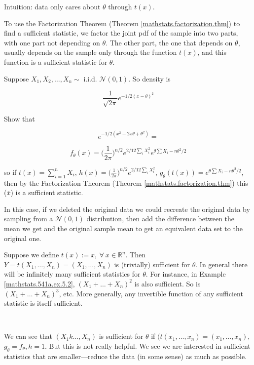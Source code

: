 \begin{remark} Intuition: data only cares about \(\theta\) through \(t(x)\). 

\end{remark}

To use the Factorization Theorem (Theorem \ref{mathstats.factorization.thm}) to find a sufficient statistic, we factor the joint pdf of the sample into two parts, with one part not depending on \(\theta\). The other part, the one that depends on \(\theta\), usually depends on the sample only through the function \(t(x)\), and this function is a sufficient statistic for \(\theta\).

\begin{exercise} Suppose \(X_1, X_2, \ldots, X_n \sim\) i.i.d. \(\mathcal{N}(0,1)\). So density is 

\[
\frac{1}{\sqrt{2 \pi}} e^{- 1/2(x- \theta)^2} 
\]

Show that 

\[
e^{-1/2(x^2 -2x \theta + \theta^2)} = 
\]

\[
f_\theta(x) = \bigg( \frac{1}{2\pi} \bigg)^{n/2} e^{2/12 \sum_i X_i^2} e^{\theta \sum X_i - n\theta^2/2}
\]

so if \(t(x) = \sum_{i=1}^n X_i\), \(h(x) =  \bigg( \frac{1}{2\pi} \bigg)^{n/2} e^{2/12 \sum_i X_i^2} \), \(g_\theta(t(x)) =  e^{\theta \sum X_i - n\theta^2/2}\), then by the Factorization Theorem (Theorem \ref{mathstats.factorization.thm}) this (\(\overline{x}\)) is a sufficient statistic.

\end{exercise}

\begin{remark} In this case, if we deleted the original data we could recreate the original data by sampling from a \(\mathcal{N}(0,1)\) distribution, then add the difference between the mean we get and the original sample mean to get an equivalent data set to the original one.

\end{remark}

\begin{remark} Suppose we define \(t(x):=x, \ \forall \ x \in \mathbb{R}^n\). Then \(Y = t(X_1, \ldots, X_n) = (X_1, \ldots, X_n)\) is (trivially) sufficient for \(\theta\). In general there will be infinitely many sufficient statistics for \(\theta\). For instance, in Example \ref{mathstats.541a.ex.5.2}, \((X_1 + \ldots + X_n)^2\) is also sufficient. So is  \((X_1 + \ldots + X_n)^3\), etc. More generally, any invertible function of any sufficient statistic is itself sufficient.

\

We can see that \((X_1k \ldots, X_n)\) is sufficient for \(\theta\) if \((t(x_1, \ldots, x_n) = (x_1, \ldots, x_n)\), \(g_\theta = f_\theta, h =1\). But this is not really helpful. We see we are interested in sufficient statistics that are smaller---reduce the data (in some sense) as much as possible.

\end{remark}

